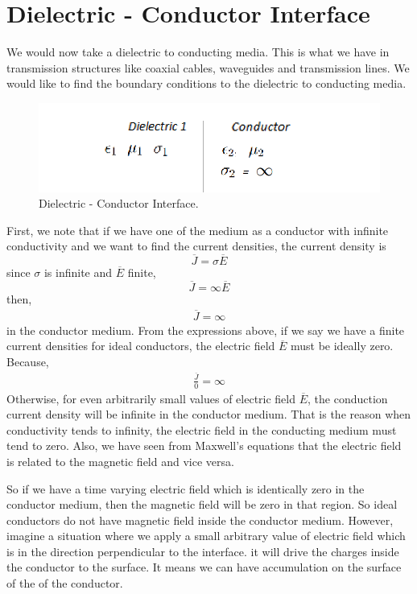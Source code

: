 \section{Dielectric - Conductor Interface}
We would now take a dielectric to conducting media. This is what we have in transmission structures like coaxial cables, waveguides and transmission lines. We would like to find the boundary conditions to the dielectric to conducting media. 
\begin{figure}[h]
\centering
\includegraphics[width=1\linewidth]{./graphics/diemedium5_2}
\caption{Dielectric - Conductor Interface.}
\end{figure}

First, we note that if we have one of the medium as a  conductor with infinite conductivity and we want to find the current densities, the current density is 
\begin{equation}
\overline{J} = \sigma\overline{E}
\end{equation}
since $\sigma$ is infinite and $\overline{E}$ finite,
\begin{equation*}
\overline{J} = \infty\overline{E}
\end{equation*} 
then,
\begin{align*}
\overline{J} = \infty
\end{align*}
in the conductor medium. From the expressions above, if we say we have a finite current densities for ideal conductors, the electric field $\overline{E}$ must be ideally zero. Because,
\begin{align*}
\frac{\overline{J}}{0} = \infty
\end{align*}
Otherwise, for even arbitrarily small values of electric field $\overline{E}$, the conduction current density will be infinite in the conductor medium. That is the reason when conductivity tends to infinity, the electric field in the conducting medium must tend to zero. Also, we have seen from Maxwell's equations that the electric field is related to the magnetic field and vice versa. 

So if we have a time varying electric field which is identically zero in the conductor medium, then the magnetic field will be zero in that region. So ideal conductors do not have magnetic field inside the conductor medium. However, imagine a situation where we apply a small arbitrary value of electric field which is in the direction perpendicular to the interface. it will drive the charges inside the conductor to the surface. It means we can have accumulation on the surface of the of the conductor. 

